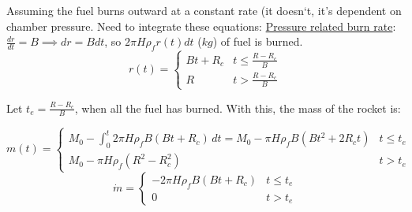 \documentclass[12pt,a4paper]{article}
\begin{document}
Assuming the fuel burns outward at a constant rate (it doesn‘t, it’s dependent on chamber pressure. Need to integrate these equations: \hyperlink{https://www.nakka-rocketry.net/burnrate.html}{Pressure related burn rate}: $\frac{dr}{dt}=B\implies dr=Bdt$, so $2\pi H \rho_f r(t)dt$ ($kg$) of fuel is burned.
\begin{equation}
r(t) = \begin{cases}
Bt + R_c & t \le \frac{R - R_c}{B} \\
R      & t > \frac{R - R_c}{B}
\end{cases}
\label{eq:inner-radius}
\end{equation}

Let $t_e = \frac{R-R_c}{B}$, when all the fuel has burned. With this, the mass of the rocket is:

\begin{equation}
m(t) = \begin{cases}
M_0 - \int_0^t 2\pi H \rho_f B (Bt+R_c)\,dt = M_0 - \pi H \rho_f B (Bt^2+2R_c t) & t \le t_e \\
M_0 - \pi H \rho_f (R^2 - R_c^2)                                                 & t > t_e
\end{cases}
\label{eq:mass}
\end{equation}
\begin{equation}
\dot{m} = \begin{cases}
-2 \pi H \rho_f B (Bt + R_c) & t\le t_e \\
0                            & t > t_e
\end{cases}
\label{eq:mdot}
\end{equation}

\end{document}
